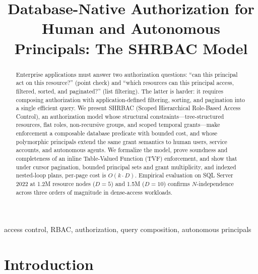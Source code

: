 \documentclass[conference]{IEEEtran}
\begin{document}
\title{Database-Native Authorization for Human and Autonomous Principals: The SHRBAC Model}

\author{}

\maketitle

\begin{abstract}
Enterprise applications must answer two authorization questions: ``can this principal act on this resource?'' (point check) and ``which resources can this principal access, filtered, sorted, and paginated?'' (list filtering). The latter is harder: it requires composing authorization with application-defined filtering, sorting, and pagination into a single efficient query. We present SHRBAC (Scoped Hierarchical Role-Based Access Control), an authorization model whose structural constraints---tree-structured resources, flat roles, non-recursive groups, and scoped temporal grants---make enforcement a composable database predicate with bounded cost, and whose polymorphic principals extend the same grant semantics to human users, service accounts, and autonomous agents. We formalize the model, prove soundness and completeness of an inline Table-Valued Function (TVF) enforcement, and show that under cursor pagination, bounded principal sets and grant multiplicity, and indexed nested-loop plans, per-page cost is $O(k \cdot D)$. Empirical evaluation on SQL Server 2022 at 1.2M resource nodes ($D{=}5$) and 1.5M ($D{=}10$) confirms $N$-independence across three orders of magnitude in dense-access workloads.
\end{abstract}

\begin{IEEEkeywords}
access control, RBAC, authorization, query composition, autonomous principals
\end{IEEEkeywords}

\section{Introduction}
\end{document}
